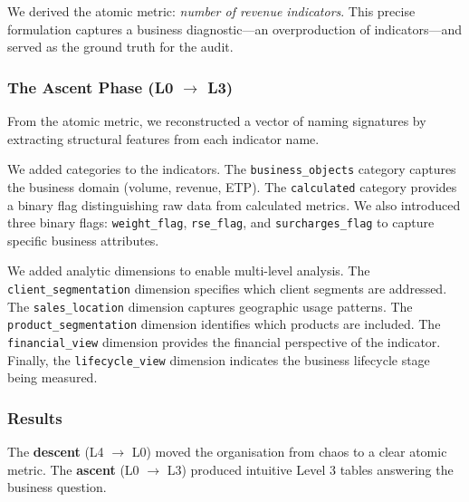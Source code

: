 \documentclass[12pt,a4paper]{article}
\begin{document}
\vspace{1em}

We derived the atomic metric: \textit{number of revenue indicators}. This precise formulation captures a business diagnostic---an overproduction of indicators---and served as the ground truth for the audit.

\vspace{1em}


\subsubsection{The Ascent Phase (L0 $\to$ L3)}

\vspace{1em}

From the atomic metric, we reconstructed a vector of naming signatures by extracting structural features from each indicator name.

\vspace{1em}

We added categories to the indicators. The \texttt{business\_objects} category captures the business domain (volume, revenue, ETP). The \texttt{calculated} category provides a binary flag distinguishing raw data from calculated metrics. We also introduced three binary flags: \texttt{weight\_flag}, \texttt{rse\_flag}, and \texttt{surcharges\_flag} to capture specific business attributes.

\vspace{1em}

We added analytic dimensions to enable multi-level analysis. The \texttt{client\_segmentation} dimension specifies which client segments are addressed. The \texttt{sales\_location} dimension captures geographic usage patterns. The \texttt{product\_segmentation} dimension identifies which products are included. The \texttt{financial\_view} dimension provides the financial perspective of the indicator. Finally, the \texttt{lifecycle\_view} dimension indicates the business lifecycle stage being measured.

\subsubsection{Results}

The \textbf{descent} (L4 $\to$ L0) moved the organisation from chaos to a clear atomic metric. The \textbf{ascent} (L0 $\to$ L3) produced intuitive Level 3 tables answering the business question.
\end{document}
